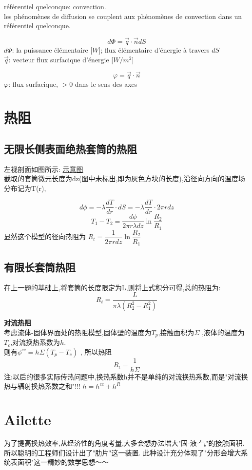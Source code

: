 \documentclass{article}
\begin{document}
r\'ef\'erentiel quelconque: convection.\\
les ph\'enom\`enes de diffusion se couplent aux ph\'enom\`enes de convection dans un r\'ef\'erentiel quelconque.

\bigskip
$$ d\Phi = \vec{q} \cdot \vec{n} dS $$
$d\Phi$: la puissance \'el\'ementaire [$W$]; flux \'el\'ementaire d'\'energie \`a travers $dS$\\
$\vec{q}$: vecteur flux surfacique d'\'energie [$W/m^2$]

$$\varphi = \vec{q} \cdot \vec{n}$$
$\varphi$: flux surfacique, $>0$ dans le sens des axes

\section{热阻}
\subsection{无限长侧表面绝热套筒的热阻}
左视剖面如图所示:
\href{http://i.imgbox.com/X9xXlBML.png}{示意图}\\
截取的套筒微元长度为dz(图中未标出,即为灰色方块的长度),沿径向方向的温度场分布记为T(r),

$$
d\phi = -\lambda \dfrac{dT}{dr}\cdot dS = -\lambda \dfrac{dT}{dr} \cdot 2\pi rdz
$$
$$ T_1 - T_2 = \dfrac{d\phi}{2\pi r\lambda dz} \ln{\dfrac{R_2}{R_1}} $$
显然这个模型的径向热阻为 $R_t = \dfrac{1}{2\pi rdz} \ln{\dfrac{R_2}{R_1}}$

\subsection{有限长套筒热阻}
在上一题的基础上,将套筒的长度限定为L,则将上式积分可得,总的热阻为:
$$ R_t = \dfrac{L}{\pi \lambda(R_2^2 - R_1^2)} $$

\textbf{对流热阻}\\
考虑流体-固体界面处的热阻模型,固体壁的温度为$T_p$,接触面积为$\Sigma$ ,液体的温度为$T_c$,对流换热系数为$h$.\\
则有$\phi^{cc} = h\Sigma(T_p - T_c)$ , 所以热阻
$$R_t = \dfrac{1}{h\Sigma}$$
注:以后的很多实际传热问题中,换热系数h并不是单纯的对流换热系数,而是"对流换热与辐射换热系数之和"!!! $h=h^{cc} + h^R$

\section{Ailette}
为了提高换热效率,从经济性的角度考量,大多会想办法增大"固-液-气"的接触面积.
所以聪明的工程师们设计出了"肋片"这一装置.
此种设计充分体现了"分形会增大系统表面积"这一精妙的数学思想～～
\end{document}
